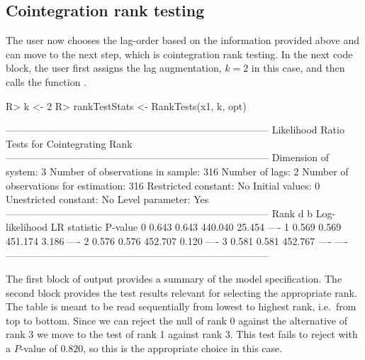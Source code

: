 \documentclass[article]{jss}
\newcommand{\fct}[1]{\code{#1()}}
\begin{document}
\subsection{Cointegration rank testing}

The user now chooses the lag-order based on the information provided above and can move to the next step, which is cointegration rank testing. 
In the next code block, the user first assigns the lag augmentation, $k = 2$ in this case, and then calls the function \fct{RankTests}. 


\begin{CodeChunk} 
\begin{CodeInput}
R> k <- 2
R> rankTestStats <- RankTests(x1, k, opt)
\end{CodeInput}
\begin{CodeOutput}
--------------------------------------------------------------------------------
             Likelihood Ratio Tests for Cointegrating Rank                               
--------------------------------------------------------------------------------
Dimension of system:       3     Number of observations in sample:          316 
Number of lags:            2     Number of observations for estimation:     316 
Restricted constant:      No     Initial values:                              0
Unestricted constant:     No     Level parameter:                           Yes
--------------------------------------------------------------------------------
Rank     d      b     Log-likelihood   LR statistic   P-value
 0     0.643  0.643          440.040         25.454      ----
 1     0.569  0.569          451.174          3.186      ----
 2     0.576  0.576          452.707          0.120      ----
 3     0.581  0.581          452.767           ----      ----
--------------------------------------------------------------------------------
\end{CodeOutput}
\end{CodeChunk} 

The first block of output provides a summary of the model specification. The second block provides the test results relevant for selecting the appropriate rank. The table is meant to be read sequentially from lowest to highest rank, i.e.\ from top to bottom. Since we can reject the null of rank 0 against the alternative of rank 3 we move to the test of rank 1 against rank 3. This test fails to reject with a $P$-value of $0.820$, so this is the appropriate choice in this case.
\end{document}
